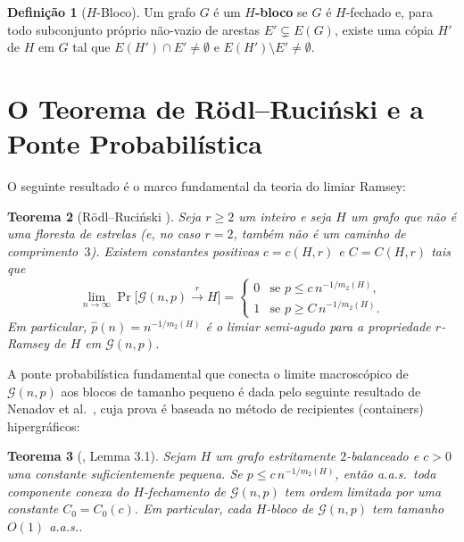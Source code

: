 \documentclass[reqno, 12pt]{amsart}
\numberwithin{equation}{section}
\theoremstyle{plain}
\newtheorem{theorem}{Teorema}[section]
\theoremstyle{definition}
\newtheorem{definition}[theorem]{Definição}
\newcommand{\Gnp}{\mathcal{G}(n,p)}
\newcommand{\ramsey}[1]{\xrightarrow{\,#1\,}}
\newcommand{\mdens}{m_2}
\newcommand{\whp}{a.a.s.}
\begin{document}
\begin{definition}[$H$-Bloco]
  \label{def:H-bloco}
  Um grafo $G$ é um \textbf{$H$-bloco} se $G$ é $H$-fechado e, para todo subconjunto próprio não-vazio de arestas $E' \subsetneq E(G)$, existe uma cópia $H'$ de $H$ em $G$ tal que $E(H') \cap E' \ne \emptyset$ e $E(H') \setminus E' \ne \emptyset$.
\end{definition}

\section{O Teorema de Rödl--Ruciński e a Ponte Probabilística}
\label{sec:rodl-rucinski}

O seguinte resultado é o marco fundamental da teoria do limiar Ramsey:

\begin{theorem}[Rödl--Ruciński \cite{rodl1993lower, rodl1994random, rodl1995threshold}]
  \label{thm:rodl-rucinski}
  Seja $r \ge 2$ um inteiro e seja $H$ um grafo que não é uma floresta de estrelas
  (e, no caso $r = 2$, também não é um caminho de comprimento~$3$).
  Existem constantes positivas $c = c(H,r)$ e $C = C(H,r)$ tais que
  \[
    \lim_{n\to\infty} \Pr\!\bigl[\Gnp \ramsey{r} H\bigr] =
    \begin{cases}
      0 & \text{se } p \le c\, n^{-1/\mdens(H)}, \\
      1 & \text{se } p \ge C\, n^{-1/\mdens(H)}.
    \end{cases}
  \]
  Em particular, $\hat{p}(n) = n^{-1/\mdens(H)}$ é o limiar semi-agudo para
  a propriedade $r$-Ramsey de $H$ em $\Gnp$.
\end{theorem}

A ponte probabilística fundamental que conecta o limite macroscópico de $\Gnp$
aos blocos de tamanho pequeno é dada pelo seguinte resultado de Nenadov et al.~\cite{nenadov2017algorithmic},
cuja prova é baseada no método de recipientes (containers) hipergráficos:

\begin{theorem}[\cite{nenadov2017algorithmic}, Lemma 3.1]
  \label{thm:nenadov-steger}
  Sejam $H$ um grafo estritamente $2$-balanceado e $c > 0$ uma constante suficientemente pequena.
  Se $p \le c\, n^{-1/\mdens(H)}$, então \whp\ toda componente conexa do $H$-fechamento de $\Gnp$
  tem ordem limitada por uma constante $C_0 = C_0(c)$. Em particular, cada $H$-bloco de $\Gnp$
  tem tamanho $O(1)$ \whp.
\end{theorem}
\end{document}
